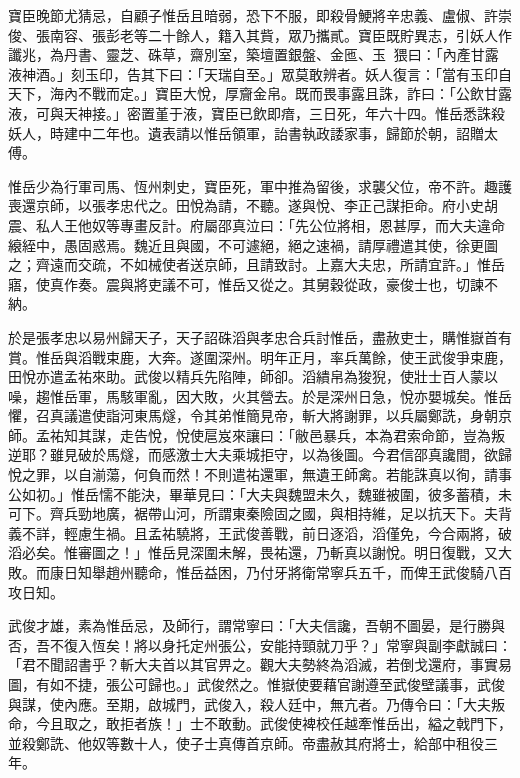 \begin{pinyinscope}
 寶臣晚節尤猜忌，自顧子惟岳且暗弱，恐下不服，即殺骨鯁將辛忠義、盧俶、許崇俊、張南容、張彭老等二十餘人，籍入其貲，眾乃攜貳。寶臣既貯異志，引妖人作讖兆，為丹書、靈芝、硃草，齋別室，築壇置銀盤、金匜、玉，猥曰：「內產甘露液神酒。」刻玉印，告其下曰：「天瑞自至。」眾莫敢辨者。妖人復言：「當有玉印自天下，海內不戰而定。」寶臣大悅，厚齎金帛。既而畏事露且誅，詐曰：「公飲甘露液，可與天神接。」密置堇于液，寶臣已飲即瘖，三日死，年六十四。惟岳悉誅殺妖人，時建中二年也。遺表請以惟岳領軍，詒書執政諉家事，歸節於朝，詔贈太傅。



 惟岳少為行軍司馬、恆州刺史，寶臣死，軍中推為留後，求襲父位，帝不許。趣護喪還京師，以張孝忠代之。田悅為請，不聽。遂與悅、李正己謀拒命。府小史胡震、私人王他奴等專畫反計。府屬邵真泣曰：「先公位將相，恩甚厚，而大夫違命縗絰中，愚固惑焉。魏近且與國，不可遽絕，絕之速禍，請厚禮遣其使，徐更圖之；齊遠而交疏，不如械使者送京師，且請致討。上嘉大夫忠，所請宜許。」惟岳寤，使真作奏。震與將吏議不可，惟岳又從之。其舅穀從政，豪俊士也，切諫不納。



 於是張孝忠以易州歸天子，天子詔硃滔與孝忠合兵討惟岳，盡赦吏士，購惟嶽首有賞。惟岳與滔戰束鹿，大奔。遂圍深州。明年正月，率兵萬餘，使王武俊爭束鹿，田悅亦遣孟祐來助。武俊以精兵先陷陣，師卻。滔繢帛為狻猊，使壯士百人蒙以噪，趨惟岳軍，馬駭軍亂，因大敗，火其營去。於是深州日急，悅亦嬰城矣。惟岳懼，召真議遣使詣河東馬燧，令其弟惟簡見帝，斬大將謝罪，以兵屬鄭詵，身朝京師。孟祐知其謀，走告悅，悅使扈岌來讓曰：「敝邑暴兵，本為君索命節，豈為叛逆耶？雖見破於馬燧，而感激士大夫乘城拒守，以為後圖。今君信邵真讒間，欲歸悅之罪，以自湔蕩，何負而然！不則遣祐還軍，無遺王師禽。若能誅真以徇，請事公如初。」惟岳懦不能決，畢華見曰：「大夫與魏盟未久，魏雖被圍，彼多蓄積，未可下。齊兵勁地廣，裾帶山河，所謂東秦險固之國，與相持維，足以抗天下。夫背義不詳，輕慮生禍。且孟祐驍將，王武俊善戰，前日逐滔，滔僅免，今合兩將，破滔必矣。惟審圖之！」惟岳見深圍未解，畏祐還，乃斬真以謝悅。明日復戰，又大敗。而康日知舉趙州聽命，惟岳益困，乃付牙將衛常寧兵五千，而俾王武俊騎八百攻日知。



 武俊才雄，素為惟岳忌，及師行，謂常寧曰：「大夫信讒，吾朝不圖晏，是行勝與否，吾不復入恆矣！將以身托定州張公，安能持頸就刀乎？」常寧與副李獻誠曰：「君不聞詔書乎？斬大夫首以其官畀之。觀大夫勢終為滔滅，若倒戈還府，事實易圖，有如不捷，張公可歸也。」武俊然之。惟嶽使要藉官謝遵至武俊壁議事，武俊與謀，使內應。至期，啟城門，武俊入，殺人廷中，無亢者。乃傳令曰：「大夫叛命，今且取之，敢拒者族！」士不敢動。武俊使裨校任越牽惟岳出，縊之戟門下，並殺鄭詵、他奴等數十人，使子士真傳首京師。帝盡赦其府將士，給部中租役三年。




\end{pinyinscope}
